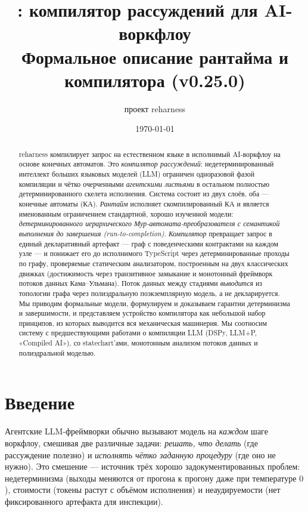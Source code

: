 \documentclass[11pt]{article}
\title{\reharness: компилятор рассуждений для AI-воркфлоу\\[4pt]
\large Формальное описание рантайма и компилятора (v0.25.0)}
\author{проект reharness}
\date{\today}
\theoremstyle{plain}
\theoremstyle{definition}
\theoremstyle{remark}
\newcommand{\reharness}{\textsf{reharness}}
\begin{document}
\maketitle

\begin{abstract}
\reharness{} компилирует запрос на естественном языке в исполнимый AI-воркфлоу на
основе конечных автоматов. Это \emph{компилятор рассуждений}: недетерминированный
интеллект больших языковых моделей (LLM) ограничен одноразовой фазой компиляции и
чётко очерченными \emph{агентскими листьями} в остальном полностью детерминированного
скелета исполнения. Система состоит из двух слоёв, оба --- конечные автоматы (КА).
\emph{Рантайм} исполняет скомпилированный КА и является именованным ограничением
стандартной, хорошо изученной модели: \emph{детерминированного иерархического
Мур-автомата-преобразователя с семантикой выполнения до завершения (run-to-completion)}.
\emph{Компилятор} превращает запрос в единый декларативный артефакт --- граф с
поведенческими контрактами на каждом узле --- и понижает его до исполнимого TypeScript
через детерминированные проходы по графу, проверяемые статическим анализатором,
построенным на двух классических движках (достижимость через транзитивное замыкание и
монотонный фреймворк потоков данных Кама--Ульмана). Поток данных между стадиями
\emph{выводится} из топологии графа через полиэдральную поэкземплярную модель, а не
декларируется. Мы приводим формальные модели, формулируем и доказываем гарантии
детерминизма и завершимости, и представляем устройство компилятора как небольшой набор
принципов, из которых выводится вся механическая машинерия. Мы соотносим систему с
предшествующими работами о компиляции LLM (DSPy, LLM+P, «Compiled AI»),
со statechart'ами, монотонным анализом потоков данных и полиэдральной моделью.
\end{abstract}

\tableofcontents

\section{Введение}

Агентские LLM-фреймворки обычно вызывают модель на \emph{каждом} шаге воркфлоу, смешивая
две различные задачи: \emph{решать, что делать} (где рассуждение полезно) и
\emph{исполнять чётко заданную процедуру} (где оно не нужно). Это смешение --- источник
трёх хорошо задокументированных проблем: недетерминизма (выходы меняются от прогона к
прогону даже при температуре $0$), стоимости (токены растут с объёмом исполнения) и
неаудируемости (нет фиксированного артефакта для инспекции).
\end{document}
